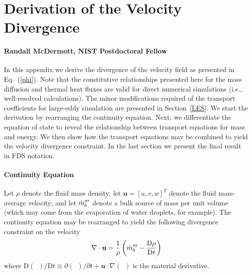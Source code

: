 \documentclass[11pt]{book}
\begin{document}
%





\chapter{Derivation of the Velocity Divergence}

\subsubsection{Randall McDermott, NIST Postdoctoral Fellow}

In this appendix we derive the divergence of the velocity field as presented in Eq.~(\ref{phi}).
Note that the constitutive relationships presented here for the mass diffusion and thermal heat fluxes are valid for direct numerical simulations (i.e., well-resolved calculations).
The minor modifications required of the transport coefficients for large-eddy simulation are presented in Section~\ref{LES}.  We start the derivation by rearranging the continuity equation.
Next, we differentiate the equation of state to reveal the relationship between transport equations for mass and energy.
We then show how the transport equations may be combined to yield the velocity divergence constraint.  In the last section we present the final result in FDS notation.

\subsubsection{Continuity Equation}
\label{continuity}

Let $\rho$ denote the fluid mass density; let $\mathbf{u} = [u,v,w]^T$ denote the fluid mass-average velocity; and let $\dot{m}_b^{{\prime\prime\prime}}$
denote a bulk source of mass per unit volume (which may come from the evaporation of water droplets, for example).
The continuity equation may be rearranged to yield the following divergence constraint on the velocity
\begin{equation}
\label{eqn_divconstraint1}
\nabla\cdot \mathbf{u} = \frac{1}{\rho} \left( \dot{m}_b^{{\prime\prime\prime}} -  \frac{\mbox{D} \rho}{\mbox{D} t} \right)
\end{equation}
where $\mbox{D}(\,\,\,)/\mbox{D} t \equiv \partial (\,\,\,)/\partial t + \mathbf{u}\cdot\nabla(\,\,\,)$ is the material derivative.
\end{document}
